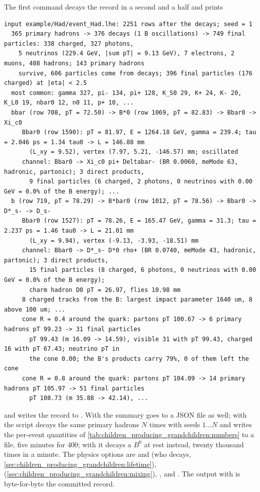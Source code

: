 The first command decays the record in a second and a half and prints
\begin{verbatim}
input example/Had/event_Had.lhe: 2251 rows after the decays; seed = 1
  365 primary hadrons -> 376 decays (1 B oscillations) -> 749 final particles: 338 charged, 327 photons,
    5 neutrinos (229.4 GeV, |sum pT| = 9.13 GeV), 7 electrons, 2 muons, 408 hadrons; 143 primary hadrons
    survive, 606 particles come from decays; 396 final particles (176 charged) at |eta| < 2.5
  most common: gamma 327, pi- 134, pi+ 128, K_S0 29, K+ 24, K- 20, K_L0 19, nbar0 12, n0 11, p+ 10, ...
  bbar (row 708, pT = 72.50) -> B*0 (row 1069, pT = 82.83) -> Bbar0 -> Xi_c0
     Bbar0 (row 1590): pT = 81.97, E = 1264.18 GeV, gamma = 239.4; tau = 2.046 ps = 1.34 tau0 -> L = 146.88 mm
       (L_xy = 9.52), vertex (7.97, 5.21, -146.57) mm; oscillated
     channel: Bbar0 -> Xi_c0 pi+ Deltabar- (BR 0.0060, meMode 63, hadronic, partonic); 3 direct products,
       9 final particles (6 charged, 2 photons, 0 neutrinos with 0.00 GeV = 0.0% of the B energy); ...
  b (row 719, pT = 78.29) -> B*bar0 (row 1012, pT = 78.56) -> Bbar0 -> D*_s- -> D_s-
     Bbar0 (row 1527): pT = 78.26, E = 165.47 GeV, gamma = 31.3; tau = 2.237 ps = 1.46 tau0 -> L = 21.01 mm
       (L_xy = 9.94), vertex (-9.13, -3.93, -18.51) mm
     channel: Bbar0 -> D*_s- D*0 rho+ (BR 0.0740, meMode 43, hadronic, partonic); 3 direct products,
       15 final particles (8 charged, 6 photons, 0 neutrinos with 0.00 GeV = 0.0% of the B energy);
       charm hadron D0 pT = 26.97, flies 10.98 mm
     8 charged tracks from the B: largest impact parameter 1640 um, 8 above 100 um; ...
     cone R = 0.4 around the quark: partons pT 100.67 -> 6 primary hadrons pT 99.23 -> 31 final particles
       pT 99.43 (m 16.09 -> 14.59), visible 31 with pT 99.43, charged 16 with pT 67.43; neutrino pT in
       the cone 0.00; the B's products carry 79%, 0 of them left the cone
     cone R = 0.8 around the quark: partons pT 104.09 -> 14 primary hadrons pT 105.97 -> 51 final particles
       pT 108.73 (m 35.88 -> 42.14), ...
\end{verbatim}
and writes the record to . With
 the summary goes to a JSON file as well; with
 the script decays the same primary hadrons $N$ times with
seeds $1\ldots N$ and writes the per-event quantities of
\cref{tab:children_producing_grandchildren:numbers} to a 
file, five minutes for $400$; with  it decays a $B^0$ at
rest instead, twenty thousand times in a minute. The physics options are
 and  (who decays,
\cref{sec:children_producing_grandchildren:lifetime}), 
(\cref{sec:children_producing_grandchildren:mixing}), ,
and . The output with  is byte-for-byte the
committed record.

